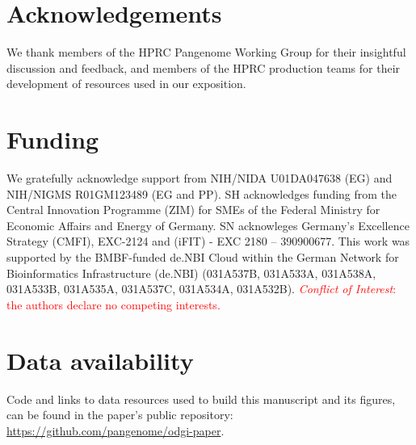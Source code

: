 \documentclass{bioinfo}
\newcommand{\REVIEWED}[1]{{\textcolor{Red}{#1}}}
\begin{document}

\section*{Acknowledgements}

We thank members of the HPRC Pangenome Working Group for their insightful discussion and feedback, and members of the HPRC production teams for their development of resources used in our exposition.

\section*{Funding}

We gratefully acknowledge support from NIH/NIDA U01DA047638 (EG) and NIH/NIGMS R01GM123489 (EG and PP).
SH acknowledges funding from the Central Innovation Programme (ZIM) for SMEs of the Federal Ministry for Economic Affairs and Energy of Germany. SN acknowleges Germany’s Excellence Strategy (CMFI), EXC-2124 and (iFIT) - EXC 2180 – 390900677.
This work was supported by the BMBF-funded de.NBI Cloud within the German Network for Bioinformatics Infrastructure (de.NBI) (031A537B, 031A533A, 031A538A, 031A533B, 031A535A, 031A537C, 031A534A, 031A532B).
\linebreak
\linebreak
\REVIEWED{\textit{Conflict of Interest}: the authors declare no competing interests.}


\section*{Data availability}

Code and links to data resources used to build this manuscript and its figures, can be found in the paper's public repository: \url{https://github.com/pangenome/odgi-paper}.



%
%
%
%
%
%
%

\end{document}
